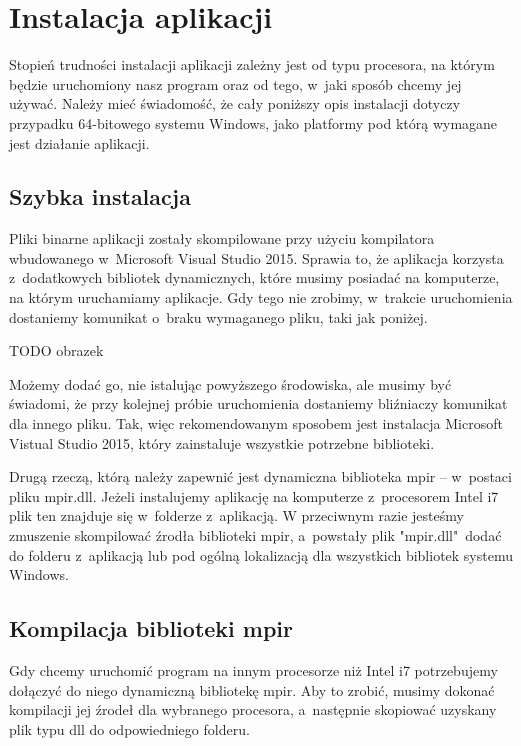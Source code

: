 \section{Instalacja aplikacji}

Stopień trudności instalacji aplikacji zależny jest od typu procesora, na którym będzie uruchomiony nasz program oraz od tego, w~jaki sposób chcemy jej używać. Należy mieć świadomość, że cały poniższy opis instalacji dotyczy przypadku 64-bitowego systemu Windows, jako platformy pod którą wymagane jest działanie aplikacji.

\subsection{Szybka instalacja}

Pliki binarne aplikacji zostały skompilowane przy użyciu kompilatora wbudowanego w~Microsoft Visual Studio 2015. Sprawia to, że aplikacja korzysta z~dodatkowych bibliotek dynamicznych, które musimy posiadać na komputerze, na którym uruchamiamy aplikacje. Gdy tego nie zrobimy, w~trakcie uruchomienia dostaniemy komunikat o~braku wymaganego pliku, taki jak poniżej.

TODO obrazek

Możemy dodać go, nie istalując powyższego środowiska, ale musimy być świadomi, że przy kolejnej próbie uruchomienia dostaniemy bliźniaczy komunikat dla innego pliku. Tak, więc rekomendowanym sposobem jest instalacja Microsoft Vistual Studio 2015, który zainstaluje wszystkie potrzebne biblioteki.

Drugą rzeczą, którą należy zapewnić jest dynamiczna biblioteka mpir -- w~postaci pliku mpir.dll. Jeżeli instalujemy aplikację na komputerze z~procesorem Intel i7 plik ten znajduje się w~folderze z~aplikacją. W przeciwnym razie jesteśmy zmuszenie skompilować źrodła biblioteki mpir, a~powstały plik "mpir.dll"\ dodać do folderu z~aplikacją lub pod ogólną lokalizacją dla wszystkich bibliotek systemu Windows.

\subsection{Kompilacja biblioteki mpir}

Gdy chcemy uruchomić program na innym procesorze niż Intel i7 potrzebujemy dołączyć do niego dynamiczną bibliotekę mpir. Aby to zrobić, musimy dokonać kompilacji jej źrodeł dla wybranego procesora, a~następnie skopiować uzyskany plik typu dll do odpowiedniego folderu.

